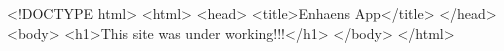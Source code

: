 <!DOCTYPE html>
<html>
<head>
  <title>Enhaens App</title>
</head>
<body>
  <h1>This site was under working!!!</h1>
</body>
</html>
